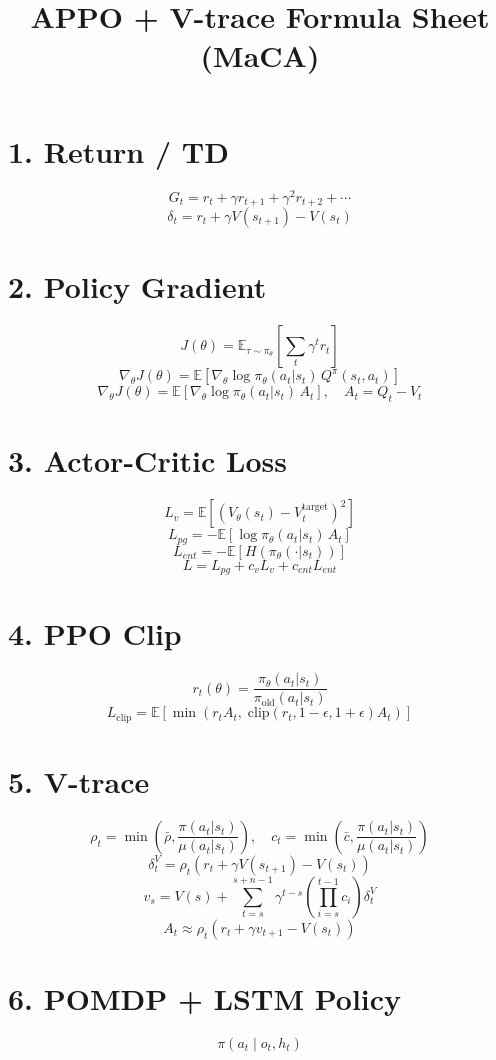 \documentclass[11pt]{article}
\title{APPO + V-trace Formula Sheet (MaCA)}
\author{}
\date{}
\begin{document}
\maketitle

\section*{1. Return / TD}
\[
G_t = r_t + \gamma r_{t+1} + \gamma^2 r_{t+2} + \cdots
\]
\[
\delta_t = r_t + \gamma V(s_{t+1}) - V(s_t)
\]

\section*{2. Policy Gradient}
\[
J(\theta) = \mathbb{E}_{\tau\sim\pi_\theta}\left[\sum_t \gamma^t r_t\right]
\]
\[
\nabla_\theta J(\theta)=
\mathbb{E}\left[\nabla_\theta\log\pi_\theta(a_t|s_t)\,Q^\pi(s_t,a_t)\right]
\]
\[
\nabla_\theta J(\theta)=
\mathbb{E}\left[\nabla_\theta\log\pi_\theta(a_t|s_t)\,A_t\right],\quad
A_t=Q_t-V_t
\]

\section*{3. Actor-Critic Loss}
\[
L_v=\mathbb{E}\left[(V_\theta(s_t)-V_t^{\text{target}})^2\right]
\]
\[
L_{pg}=-\mathbb{E}\left[\log\pi_\theta(a_t|s_t)\,A_t\right]
\]
\[
L_{ent}=-\mathbb{E}\left[H(\pi_\theta(\cdot|s_t))\right]
\]
\[
L=L_{pg}+c_v L_v+c_{ent}L_{ent}
\]

\section*{4. PPO Clip}
\[
r_t(\theta)=\frac{\pi_\theta(a_t|s_t)}{\pi_{\text{old}}(a_t|s_t)}
\]
\[
L_{\text{clip}}=
\mathbb{E}\left[
\min\left(r_tA_t,\;\text{clip}(r_t,1-\epsilon,1+\epsilon)A_t\right)
\right]
\]

\section*{5. V-trace}
\[
\rho_t=\min\left(\bar{\rho},\frac{\pi(a_t|s_t)}{\mu(a_t|s_t)}\right),\quad
c_t=\min\left(\bar{c},\frac{\pi(a_t|s_t)}{\mu(a_t|s_t)}\right)
\]
\[
\delta_t^V=
\rho_t\left(r_t+\gamma V(s_{t+1})-V(s_t)\right)
\]
\[
v_s=
V(s)+
\sum_{t=s}^{s+n-1}
\gamma^{t-s}
\left(\prod_{i=s}^{t-1}c_i\right)\delta_t^V
\]
\[
A_t\approx \rho_t\left(r_t+\gamma v_{t+1}-V(s_t)\right)
\]

\section*{6. POMDP + LSTM Policy}
\[
\pi(a_t\mid o_t,h_t)
\]
\end{document}
